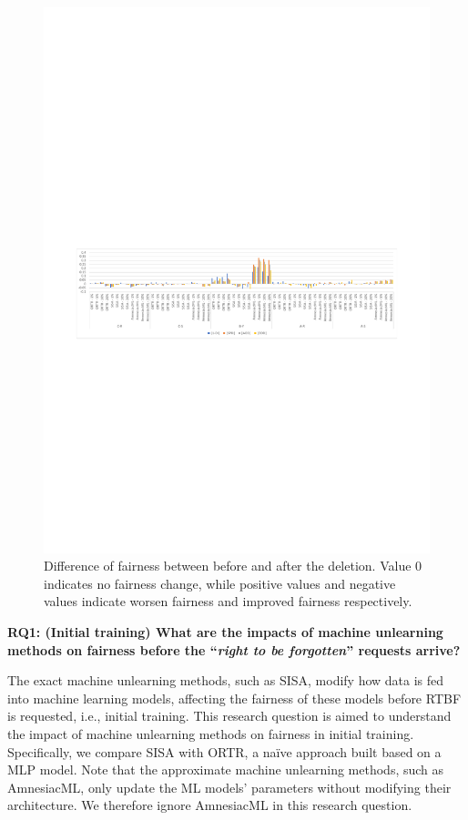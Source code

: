 \begin{figure}[t!]
  \centering
  \includegraphics[width=1.0\textwidth]{assets/rq2-fairness-diff.pdf}
  \caption{Difference of fairness between before and after the deletion. Value 0 indicates no fairness change, while positive values and negative values indicate worsen fairness and improved fairness respectively. 
  }
  \label{fig:rq2-fairness-diff}
\end{figure}

\begin{flushleft}


\noindent \textbf{RQ1: (Initial training) What are the impacts of machine unlearning methods on fairness before the ``\textit{right to be forgotten}'' requests arrive?}
\end{flushleft}


The exact machine unlearning methods, such as SISA, modify how data is fed into machine learning models, affecting the fairness of these models before RTBF is requested, i.e., initial training. 
This research question is aimed to understand the impact of
machine unlearning methods on fairness in initial training. Specifically, we compare SISA with ORTR, a na\"ive approach built based on a MLP model. Note that the approximate machine unlearning methods, such as AmnesiacML, only update the ML models' parameters without modifying their architecture. We therefore ignore AmnesiacML in this research question. 

